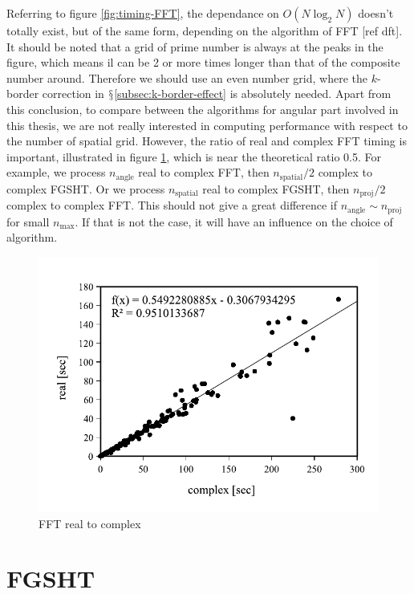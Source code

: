 Referring to figure \ref{fig:timing-FFT}, the dependance on $O(N\log_{2}N)$
\textcolor{red}{\scriptsize{}\citep{Numerical_Recipes_3ed}} doesn't
totally exist, but of the same form, depending on the algorithm of FFT %
{[}ref dft{]}. It should be noted that a grid of prime number is always
at the peaks in the figure, which means il can be 2 or more times longer %
than that of the composite number around. Therefore we should use
an even number grid, where the $k$-border correction in $\mathsection$\ref{subsec:k-border-effect}
is absolutely needed. Apart from this conclusion, to compare between
the algorithms for angular part involved in this thesis, we are not
really interested in computing performance with respect to the number
of spatial grid. However, the ratio of real and complex FFT timing
is important, illustrated in figure \ref{fig:fft-real-to-complex}, which
is near the theoretical ratio 0.5. For example, we process $n_{\mathrm{angle}}$
real to complex FFT, then $n_{\mathrm{spatial}}/2$ complex to complex
FGSHT. Or we process $n_{\mathrm{spatial}}$ real to complex FGSHT,
then $n_{\mathrm{proj}}/2$ complex to complex FFT. This should not give
a great difference if $n_{\mathrm{angle}}\sim n_{\mathrm{proj}}$
for small $n_{\max}$. If that is not the case, it will have an influence
on the choice of algorithm.
\begin{center}
\begin{figure}[h]
\begin{centering}
\includegraphics[bb=0bp 20bp 340bp 235bp,width=0.5\columnwidth]{_figure/results/fftw_real_v_cmplx}
\par\end{centering}
\caption{FFT real to complex\label{fig:fft-real-to-complex}}
\end{figure}
\par\end{center}

\section{FGSHT}

